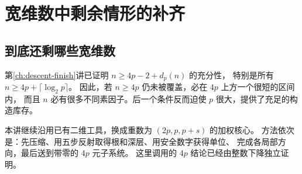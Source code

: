 \chapter{宽维数中剩余情形的补齐}\label{sec:wide}

\section{到底还剩哪些宽维数}
第\ref{ch:descent-finish}讲已证明 $n\ge4p-2+d_p(n)$ 的充分性，
特别是所有 $n\ge4p+\lceil\log_2p\rceil$。
因此，若 $n\ge4p$ 仍未被覆盖，必在 $4p$ 上方一个很短的区间内，
而且 $n$ 必有很多不同素因子。后一个条件反而迫使 $p$ 很大，提供了充足的构造库存。

本讲继续沿用已有二维工具，换成重数为 $(2p,p,p+s)$ 的加权核心。
方法依次是：先压缩、用五步反射取得根和深层、用安全数字获得单位、
完成各局部方向，最后送到带零的 $4p$ 元子系统。
这里调用的 $4p$ 结论已经由整数下降独立证明。

